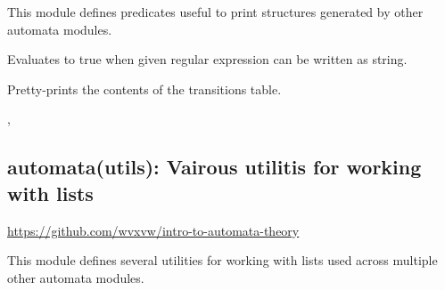 This module defines predicates useful to print structures generated by
other automata modules.\vspace{0.7cm}

\begin{description}
Evaluates to true when given regular expression  can be written
as  string.

\begin{tags}
\end{tags}

Pretty-prints the contents of the transitions table.

\begin{tags}
, 
\end{tags}
\end{description}

\subsection{automata(utils): Vairous utilitis for working with lists}

\label{sec:utils}

\begin{tags}
\url{https://github.com/wvxvw/intro-to-automata-theory}
\end{tags}

This module defines several utilities for working with lists
used across multiple other automata modules.\vspace{0.7cm}

